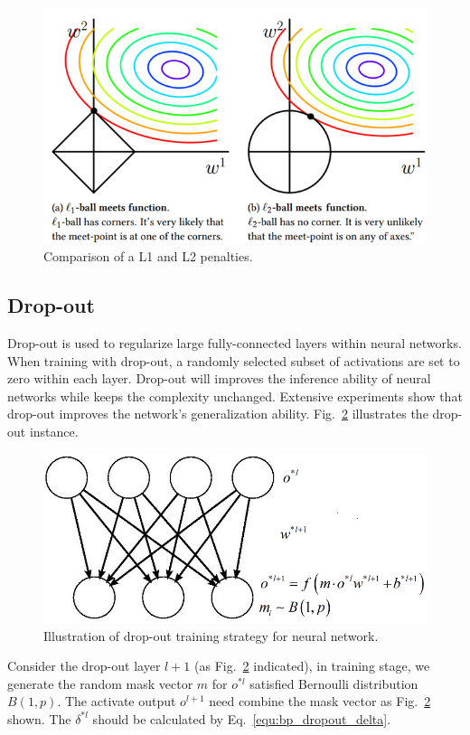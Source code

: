 \documentclass[runningheads,openany]{xhlPaper}
\begin{document}
\begin{figure}
\centering
\includegraphics[width=0.7\linewidth]{l1_l2_sparsity}
\caption{Comparison of a L1 and L2 penalties.}
\label{fig:l1_l2_sparsity}
\end{figure}

\subsection{Drop-out}
Drop-out \cite{Hinton_Dropout_2012} is used to regularize large fully-connected layers within neural networks. When training with drop-out, a randomly selected subset of activations are set to zero within each layer. 
Drop-out will improves the inference ability of neural networks while keeps the complexity unchanged. 
Extensive experiments show that drop-out improves the network's generalization ability.
Fig.~\ref{fig:bp_dropout} illustrates the drop-out instance.

\begin{figure}
\centering
\includegraphics[width=0.8\linewidth]{dropout}
\caption{Illustration of drop-out training strategy for neural network.}
\label{fig:bp_dropout}
\end{figure}

Consider the drop-out layer $l + 1$ (as Fig.~\ref{fig:bp_dropout} indicated), in training stage, we generate the random mask vector $m$ for $o^{*l}$ satisfied Bernoulli distribution $B\left( {1,p} \right)$. The activate output $o^{l + 1}$ need combine the mask vector as Fig.~\ref{fig:bp_dropout} shown. The $\delta ^{*l}$ should be calculated by Eq.~\ref{equ:bp_dropout_delta}.  
\end{document}
